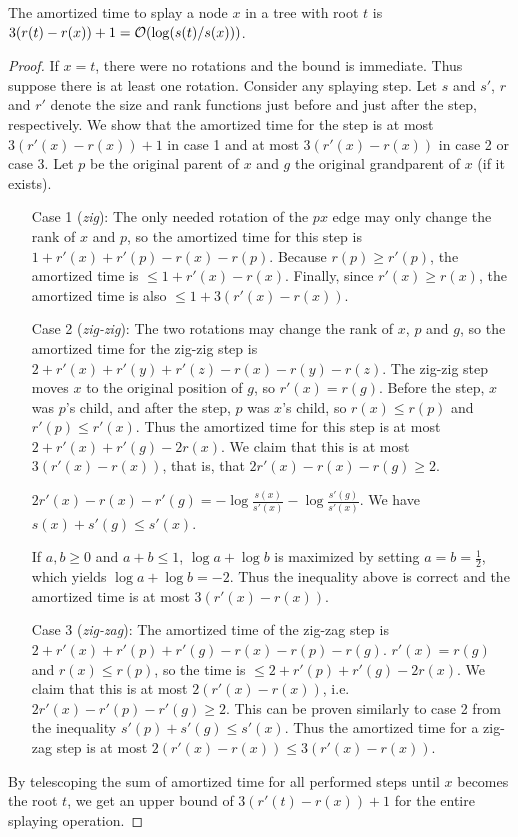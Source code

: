 \begin{lemma}
The amortized time to splay a node $x$ in a tree with root
$t$ is $3(r(t)-r(x))+1 = \mathcal{O}(\log(s(t)/s(x)))$.
\end{lemma}
\begin{proof}
If $x=t$, there were no rotations and the bound is immediate.
Thus suppose there is at least one rotation. Consider any splaying step.
Let $s$ and $s'$, $r$ and $r'$ denote the size and rank functions just before
and just after the step, respectively. We show that the amortized time for
the step is at most $3(r'(x)-r(x))+1$ in case 1 and at most $3(r'(x)-r(x))$
in case 2 or case 3. Let $p$ be the original parent of $x$ and $g$ the original
grandparent of $x$ (if it exists).

\begin{itemize}
\item[Case 1 (\textit{zig}):]
	The only needed rotation of the $px$ edge may only change the rank of
	$x$ and $p$, so the amortized time for this step is
	$1 + r'(x) + r'(p) - r(x) - r(p)$.
	Because $r(p)\geq r'(p)$, the amortized time is $\leq 1+r'(x)-r(x)$.
	Finally, since $r'(x)\geq r(x)$, the amortized time is also
	$\leq 1+3(r'(x)-r(x))$.

\item[Case 2 (\textit{zig-zig}):]
	The two rotations may change the rank of $x$, $p$ and $g$,
	so the amortized time for the zig-zig step is
	$2+r'(x)+r'(y)+r'(z)-r(x)-r(y)-r(z)$. The zig-zig step
	moves $x$ to the original position of $g$, so $r'(x)=r(g)$.
	Before the step, $x$ was $p$'s child, and after the step,
	$p$ was $x$'s child, so $r(x)\leq r(p)$ and $r'(p)\leq r'(x)$.
	Thus the amortized time for this step is at most $2+r'(x)+r'(g)-2r(x)$.
	We claim that this is at most $3(r'(x)-r(x))$, that is, that
	$2r'(x)-r(x)-r(g)\geq 2$.

	$2r'(x)-r(x)-r'(g)=-\log\frac{s(x)}{s'(x)}-\log\frac{s'(g)}{s'(x)}$.
	We have $s(x)+s'(g)\leq s'(x)$.

	If $a,b\geq 0$ and $a+b\leq 1$, $\log a + \log b$ is maximized
	by setting $a = b = \frac{1}{2}$, which yields $\log a + \log b = -2$.
	Thus the inequality above is correct and the amortized time is
	at most $3(r'(x)-r(x))$.

\item[Case 3 (\textit{zig-zag}):]
	The amortized time of the zig-zag step is
	$2+r'(x)+r'(p)+r'(g)-r(x)-r(p)-r(g)$. $r'(x)=r(g)$ and $r(x)\leq r(p)$,
	so the time is $\leq 2+r'(p)+r'(g)-2r(x)$.
	We claim that this is at most $2(r'(x)-r(x))$, i.e.
	$2r'(x)-r'(p)-r'(g)\geq 2$. This can be proven
	similarly to case 2 from the inequality $s'(p)+s'(g)\leq s'(x)$.
	Thus the amortized time for a zig-zag step is at most
	$2(r'(x)-r(x))\leq 3(r'(x)-r(x))$.
\end{itemize}

By telescoping the sum of amortized time for all performed steps until
$x$ becomes the root $t$, we get an upper bound of $3(r'(t)-r(x))+1$
for the entire splaying operation.
\end{proof}

